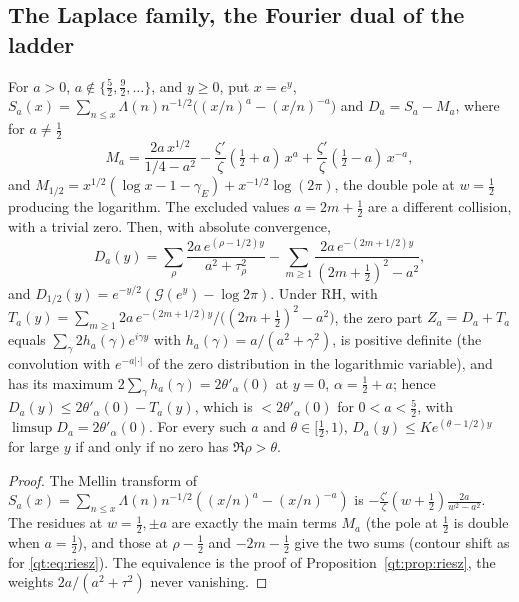 \subsection{The Laplace family, the Fourier dual of the ladder}

\begin{proposition}\label{qt:prop:laplace}
For $a>0$, $a\notin\{\tfrac52,\tfrac92,\dots\}$, and $y\ge0$, put $x=e^y$, $S_a(x)=\sum_{n\le x}\Lambda(n)n^{-1/2}\big((x/n)^a-(x/n)^{-a}\big)$ and $D_a=S_a-M_a$, where for $a\ne\tfrac12$
\[
M_a=\frac{2a\,x^{1/2}}{1/4-a^2}-\frac{\zeta'}{\zeta}(\tfrac12+a)\,x^a+\frac{\zeta'}{\zeta}(\tfrac12-a)\,x^{-a},
\]
and $M_{1/2}=x^{1/2}(\log x-1-\gamma_E)+x^{-1/2}\log(2\pi)$, the double pole at $w=\tfrac12$ producing the logarithm. The excluded values $a=2m+\tfrac12$ are a different collision, with a trivial zero. Then, with absolute convergence,
\[
D_a(y)=\sum_\rho\frac{2a\,e^{(\rho-1/2)y}}{a^2+\tau_\rho^2}-\sum_{m\ge1}\frac{2a\,e^{-(2m+1/2)y}}{(2m+\tfrac12)^2-a^2},
\]
and $D_{1/2}(y)=e^{-y/2}(\mathcal G(e^y)-\log2\pi)$. Under RH, with $T_a(y)=\sum_{m\ge1}\allowbreak2a\,e^{-(2m+1/2)y}\allowbreak/\big((2m+\tfrac12)^2-\allowbreak a^2\big)$, the zero part $Z_a=D_a+T_a$ equals $\sum_\gamma\allowbreak2h_a(\gamma)\allowbreak e^{i\gamma y}$ with $h_a(\gamma)=a/(a^2+\gamma^2)$, is positive definite (the convolution with $e^{-a|\cdot|}$ of the zero distribution in the logarithmic variable), and has its maximum $2\sum_\gamma h_a(\gamma)=2\theta'_\alpha(0)$ at $y=0$, $\alpha=\tfrac12+a$; hence $D_a(y)\le2\theta'_\alpha(0)-T_a(y)$, which is $<2\theta'_\alpha(0)$ for $0<a<\tfrac52$, with $\limsup D_a=2\theta'_\alpha(0)$. For every such $a$ and $\theta\in[\tfrac12,1)$, $D_a(y)\le Ke^{(\theta-1/2)y}$ for large $y$ if and only if no zero has $\Re\rho>\theta$.
\end{proposition}

\begin{proof}
The Mellin transform of $S_a(x)=\sum_{n\le x}\Lambda(n)n^{-1/2}((x/n)^a-(x/n)^{-a})$ is $-\frac{\zeta'}{\zeta}(w+\tfrac12)\frac{2a}{w^2-a^2}$. The residues at $w=\tfrac12,\pm a$ are exactly the main terms $M_a$ (the pole at $\tfrac12$ is double when $a=\tfrac12$), and those at $\rho-\tfrac12$ and $-2m-\tfrac12$ give the two sums (contour shift as for \eqref{qt:eq:riesz}). The equivalence is the proof of Proposition~\ref{qt:prop:riesz}, the weights $2a/(a^2+\tau^2)$ never vanishing.
\end{proof}

